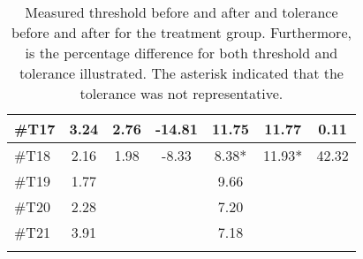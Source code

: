 \begin{longtable} {l|c|c|c|c|c|c}
\#T17 & 3.24 & 2.76 & -14.81 & 11.75 & 11.77 & 0.11 \\ \hline
\#T18 & 2.16 & 1.98 & -8.33 & 8.38* & 11.93* & 42.32 \\ \hline
\#T19 & 1.77 &  & &9.66 & &  \\ \hline
\#T20 & 2.28 &  & & 7.20     & & \\ \hline
\#T21 & 3.91 &  & & 7.18 & & \\ \hline
	\caption{Measured threshold before and after and tolerance before and after for the treatment group. Furthermore, is the percentage difference for both threshold and tolerance illustrated. The asterisk indicated that the tolerance was not representative.}
	\label{tab:Treatment}
\end{longtable}
\vspace{-.5cm}

